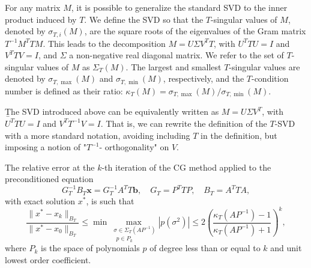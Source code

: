 \documentclass[hidelinks,onefignum,onetabnum]{siamart220329}
\newcommand{\bb}[1]{#1}
\let\vec\mathbf
\begin{document}
For any matrix $M$, it is possible to generalize the standard SVD \cite{horn} to the inner product induced by $T$. We define the SVD so that the $T$-singular values of $M$, denoted by $\sigma_{T,i}(M)$, are the square roots of the eigenvalues of the Gram matrix $T^{-1}M^TTM$. This leads to the decomposition $M = U \Sigma V^T T$, with $U^T T U = I$ and $V^T T V = I$, and \bb{$\Sigma$ a non-negative real} diagonal matrix. We refer to the set of $T$-singular values of $M$ as $\Sigma_T(M)$. The largest and smallest $T$-singular values are denoted by $\sigma_{T,\max}(M)$ and $\sigma_{T,\min}(M)$, respectively, and the $T$-condition number is defined as their ratio:
$\kappa_T(M) = \sigma_{T,\max}(M)/\sigma_{T,\min}(M)$.
\begin{remark}
    \b
    The SVD introduced above can be equivalently written as $M=U \Sigma V^T$, with $U^TTU = I$ and $V^TT^{-1}V = I$. That is, we can rewrite the definition of the $T$-SVD with a more standard notation, avoiding including $T$ in the definition, but imposing a notion of "$T^{-1}$- orthogonality" on $V$.
\end{remark}
\begin{theorem}
    \label{thm:conv}
    The relative error at the $k$-th iteration of the CG method applied to the preconditioned equation
    \begin{equation}
        \label{eq:PrecnormalPDE}
        G_T^{-1}B_T\vec{x} = G_T^{-1}A^TT\vec{b}, \quad G_T = P^TTP, \quad B_T = A^TTA,
    \end{equation}
    with exact solution $x^*$, is such that
    \begin{equation}
        \frac{\|x^* - x_k \|_{B_T}}{\|x^* - x_0 \|_{B_T}} \leq \underset{p\in P_k}{\bb{\min} \underset{\,\,\sigma \in \Sigma_T(AP^{-1})}{\bb{\max}}} |p(\sigma^2)| \leq 2 \left( \frac{\kappa_T(AP^{-1}) -1}{\kappa_T(AP^{-1}) +1} \right)^k,
    \end{equation}
    where $P_k$ is the space of polynomials $p$ of degree less than or equal to $k$ and unit lowest order coefficient.
\end{theorem}
\end{document}
